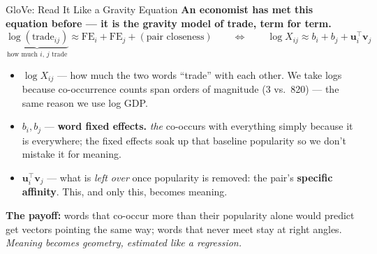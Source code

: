 \begin{frame}{GloVe: Read It Like a Gravity Equation}
\textbf{An economist has met this equation before --- it is the gravity model of trade, term for term.}
\[
   \underbrace{\log(\text{trade}_{ij})}_{\text{how much $i$, $j$ trade}} \approx \text{FE}_i + \text{FE}_j + (\text{pair closeness})
   \qquad\Longleftrightarrow\qquad
   \log X_{ij} \approx b_i + b_j + \mathbf{u}_{i}^{\top}\mathbf{v}_{j}
\]
\medskip
\begin{itemize}
\item $\log X_{ij}$ --- how much the two words ``trade'' with each other. We take logs because co-occurrence counts span orders of magnitude (3 vs.\ 820) --- the same reason we use log GDP.
\item $b_i, b_j$ --- \textbf{word fixed effects.} \emph{the} co-occurs with everything simply because it is everywhere; the fixed effects soak up that baseline popularity so we don't mistake it for meaning.
\item $\mathbf{u}_{i}^{\top}\mathbf{v}_{j}$ --- what is \emph{left over} once popularity is removed: the pair's \textbf{specific affinity}. This, and only this, becomes meaning.
\end{itemize}
\medskip
\textbf{The payoff:} words that co-occur more than their popularity alone would predict get vectors pointing the same way; words that never meet stay at right angles. \emph{Meaning becomes geometry, estimated like a regression.}
\end{frame}

